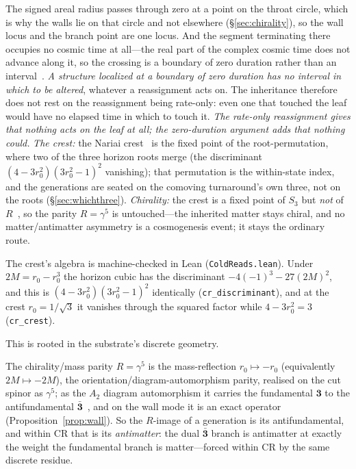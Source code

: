 \documentclass[11pt]{article}
\begin{document}
The signed areal radius passes through zero at a point on the throat circle, which is
why the walls lie on that circle and not elsewhere (\S\ref{sec:chirality}), so the wall locus and the branch
point are one locus. And the segment terminating there occupies no cosmic time at all---the real part of the
complex cosmic time does not advance along it, so the crossing is a boundary of zero duration rather than an
interval~\cite{JanzenCanonicalTime,JanzenCRframework}. \emph{A structure localized at a boundary of zero
duration has no interval in which to be altered}, whatever a reassignment acts on. The inheritance therefore
does not rest on the reassignment being rate-only: even one that touched the leaf would have no elapsed time in
which to touch it. \emph{The rate-only reassignment gives that nothing acts on the leaf at all; the
zero-duration argument adds that nothing could.} \emph{The crest:} the Nariai crest~\cite{Nariai1951} is the fixed point of the root-permutation, where two of the three horizon roots merge (the discriminant $(4-3r_0^2)(3r_0^2-1)^2$ vanishing); that permutation is the within-state index, and the generations are seated on the comoving turnaround's own three, not on the roots (\S\ref{sec:whichthree}). \emph{Chirality:} the crest is a fixed point of $S_3$ but \emph{not} of $R$~\cite{JanzenBoundary}, so the parity $R=\gamma^5$ is untouched---the inherited matter stays chiral, and no matter/antimatter asymmetry is a cosmogenesis event; it stays the ordinary route. 

The crest's algebra is machine-checked in Lean (\texttt{ColdReads.lean}). Under $2M=r_0-r_0^{3}$ the horizon cubic has the discriminant $-4(-1)^{3}-27(2M)^{2}$, and this is $(4-3r_0^{2})(3r_0^{2}-1)^{2}$ identically (\texttt{cr\_discriminant}), and at the crest $r_0=1/\sqrt3$ it vanishes through the squared factor while $4-3r_0^{2}=3$ (\texttt{cr\_crest}).

This is rooted in the substrate's discrete geometry. 

The chirality/mass parity $R=\gamma^5$ is the mass-reflection $r_0\mapsto-r_0$ (equivalently $2M\mapsto-2M$), the orientation/diagram-automorphism parity, realised on the cut spinor as $\gamma^5$; as the $A_2$ diagram automorphism it carries the fundamental $\mathbf 3$ to the antifundamental $\bar{\mathbf 3}$~\cite{JanzenSlicing,JanzenAlgebroid}, and on the wall mode it is an exact operator (Proposition~\ref{prop:wall}). So the $R$-image of a generation is its antifundamental, and within CR that is its \emph{antimatter}: the dual $\bar{\mathbf 3}$ branch is antimatter at exactly the weight the fundamental branch is matter---forced within CR by the same discrete residue. 
\end{document}
